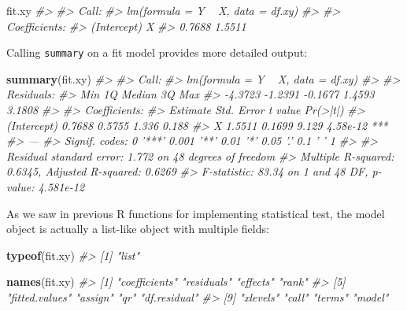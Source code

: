 \documentclass[]{book}
\newenvironment{Shaded}{\begin{snugshade}}{\end{snugshade}}
\newcommand{\CommentTok}[1]{\textcolor[rgb]{0.56,0.35,0.01}{\textit{#1}}}
\newcommand{\KeywordTok}[1]{\textcolor[rgb]{0.13,0.29,0.53}{\textbf{#1}}}
\newcommand{\NormalTok}[1]{#1}
\theoremstyle{definition}
\theoremstyle{definition}
\theoremstyle{definition}
\theoremstyle{remark}
\begin{document}
\begin{Shaded}
\begin{Highlighting}[]
\NormalTok{fit.xy}
\CommentTok{#> }
\CommentTok{#> Call:}
\CommentTok{#> lm(formula = Y ~ X, data = df.xy)}
\CommentTok{#> }
\CommentTok{#> Coefficients:}
\CommentTok{#> (Intercept)            X  }
\CommentTok{#>      0.7688       1.5511}
\end{Highlighting}
\end{Shaded}

Calling \texttt{summary} on a fit model provides more detailed output:

\begin{Shaded}
\begin{Highlighting}[]
\KeywordTok{summary}\NormalTok{(fit.xy)}
\CommentTok{#> }
\CommentTok{#> Call:}
\CommentTok{#> lm(formula = Y ~ X, data = df.xy)}
\CommentTok{#> }
\CommentTok{#> Residuals:}
\CommentTok{#>     Min      1Q  Median      3Q     Max }
\CommentTok{#> -4.3723 -1.2391 -0.1677  1.4593  3.1808 }
\CommentTok{#> }
\CommentTok{#> Coefficients:}
\CommentTok{#>             Estimate Std. Error t value Pr(>|t|)    }
\CommentTok{#> (Intercept)   0.7688     0.5755   1.336    0.188    }
\CommentTok{#> X             1.5511     0.1699   9.129 4.58e-12 ***}
\CommentTok{#> ---}
\CommentTok{#> Signif. codes:  0 '***' 0.001 '**' 0.01 '*' 0.05 '.' 0.1 ' ' 1}
\CommentTok{#> }
\CommentTok{#> Residual standard error: 1.772 on 48 degrees of freedom}
\CommentTok{#> Multiple R-squared:  0.6345, Adjusted R-squared:  0.6269 }
\CommentTok{#> F-statistic: 83.34 on 1 and 48 DF,  p-value: 4.581e-12}
\end{Highlighting}
\end{Shaded}

As we saw in previous R functions for implementing statistical test, the
model object is actually a list-like object with multiple fields:

\begin{Shaded}
\begin{Highlighting}[]
\KeywordTok{typeof}\NormalTok{(fit.xy)}
\CommentTok{#> [1] "list"}

\KeywordTok{names}\NormalTok{(fit.xy)}
\CommentTok{#>  [1] "coefficients"  "residuals"     "effects"       "rank"         }
\CommentTok{#>  [5] "fitted.values" "assign"        "qr"            "df.residual"  }
\CommentTok{#>  [9] "xlevels"       "call"          "terms"         "model"}
\end{Highlighting}
\end{Shaded}
\end{document}
